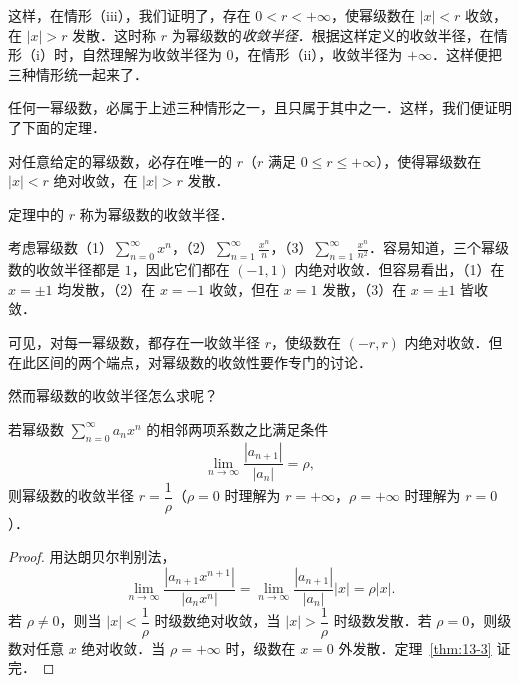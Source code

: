 这样，在情形（iii），我们证明了，存在 $0<r<+\infty$，使幂级数在 $\left|x\right|<r$ 收敛，在 $\left|x\right|>r$ 发散．这时称 $r$ 为幂级数的\emph{收敛半径}．根据这样定义的收敛半径，在情形（i）时，自然理解为收敛半径为 $0$，在情形（ii），收敛半径为 $+\infty$．这样便把三种情形统一起来了．

任何一幂级数，必属于上述三种情形之一，且只属于其中之一．这样，我们便证明了下面的定理．

\begin{theorem}\label{thm:13-2}
对任意给定的幂级数，必存在唯一的 $r$（$r$ 满足 $0\leqslant r\leqslant+\infty$），使得幂级数在 $\left|x\right|<r$ 绝对收敛，在 $\left|x\right|>r$ 发散．
\end{theorem}

定理中的 $r$ 称为幂级数的收敛半径．

\begin{example}\label{ex:13-1-1}
考虑幂级数（1）$\displaystyle\sum_{n=0}^{\infty}x^{n}$，（2）$\displaystyle\sum_{n=1}^{\infty}\frac{x^{n}}{n}$，（3）$\displaystyle\sum_{n=1}^{\infty}\frac{x^{n}}{n^{2}}$．容易知道，三个幂级数的收敛半径都是 $1$，因此它们都在 $(-1,1)$ 内绝对收敛．但容易看出，（1）在 $x=\pm 1$ 均发散，（2）在 $x=-1$ 收敛，但在 $x=1$ 发散，（3）在 $x=\pm 1$ 皆收敛．
\end{example}

可见，对每一幂级数，都存在一收敛半径 $r$，使级数在 $(-r,r)$ 内绝对收敛．但在此区间的两个端点，对幂级数的收敛性要作专门的讨论．

然而幂级数的收敛半径怎么求呢？

\begin{theorem}\label{thm:13-3}
若幂级数 $\displaystyle\sum_{n=0}^{\infty}a_{n}x^{n}$ 的相邻两项系数之比满足条件
\[
\lim_{n\to\infty}\frac{\left|a_{n+1}\right|}{\left|a_{n}\right|}=\rho,
\]
则幂级数的收敛半径 $r=\dfrac{1}{\rho}$（$\rho=0$ 时理解为 $r=+\infty$，$\rho=+\infty$ 时理解为 $r=0$）．
\end{theorem}

\begin{proof}
用达朗贝尔判别法，
\[
\lim_{n\to\infty}\frac{\left|a_{n+1}x^{n+1}\right|}{\left|a_{n}x^{n}\right|}=\lim_{n\to\infty}\frac{\left|a_{n+1}\right|}{\left|a_{n}\right|}\left|x\right|=\rho\left|x\right|.
\]
若 $\rho\neq 0$，则当 $\left|x\right|<\dfrac{1}{\rho}$ 时级数绝对收敛，当 $\left|x\right|>\dfrac{1}{\rho}$ 时级数发散．若 $\rho=0$，则级数对任意 $x$ 绝对收敛．当 $\rho=+\infty$ 时，级数在 $x=0$ 外发散．定理~\ref{thm:13-3} 证完．
\end{proof}

